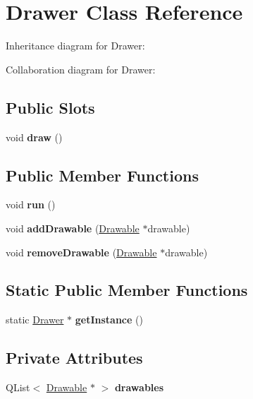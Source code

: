 \hypertarget{classDrawer}{}\section{Drawer Class Reference}
\label{classDrawer}


Inheritance diagram for Drawer\+:


Collaboration diagram for Drawer\+:
\subsection*{Public Slots}
\begin{DoxyCompactItemize}
\item 
\mbox{\label{classDrawer_a3fb31f7236333f3e387d7d83bccf9866}} 
void {\bfseries draw} ()
\end{DoxyCompactItemize}
\subsection*{Public Member Functions}
\begin{DoxyCompactItemize}
\item 
\mbox{\label{classDrawer_aa8811cb8a375a97da09f94f17ccdc3dc}} 
void {\bfseries run} ()
\item 
\mbox{\label{classDrawer_accf50a807abbcc6ffaf4809d01b4dbee}} 
void {\bfseries add\+Drawable} (\hyperlink{classDrawable}{Drawable} $\ast$drawable)
\item 
\mbox{\label{classDrawer_ad899b6f6806f29f86bb73a2dee5e3516}} 
void {\bfseries remove\+Drawable} (\hyperlink{classDrawable}{Drawable} $\ast$drawable)
\end{DoxyCompactItemize}
\subsection*{Static Public Member Functions}
\begin{DoxyCompactItemize}
\item 
\mbox{\label{classDrawer_a988c4171baacab7abac3caef25097dfe}} 
static \hyperlink{classDrawer}{Drawer} $\ast$ {\bfseries get\+Instance} ()
\end{DoxyCompactItemize}
\subsection*{Private Attributes}
\begin{DoxyCompactItemize}
\item 
\mbox{\label{classDrawer_a04d4cf7872ab75606136e232768afbae}} 
Q\+List$<$ \hyperlink{classDrawable}{Drawable} $\ast$ $>$ {\bfseries drawables}
\end{DoxyCompactItemize}
